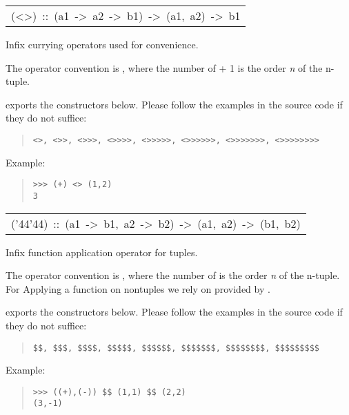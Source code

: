\begin{haddockdesc}
\item[\begin{tabular}{@{}l}
(<>)\ ::\ (a1\ ->\ a2\ ->\ b1)\ ->\ (a1,\ a2)\ ->\ b1
\end{tabular}]\haddockbegindoc
Infix currying operators used for convenience. \par
The operator convention is \haddocktt{(<>+)}, where the number of \haddocktt{>} + 1 is
 the order \emph{n} of the n-tuple.\par
{} exports the constructors below. Please
 follow the examples in the source code if they do not suffice:\par
\begin{quote}
{\haddockverb\begin{verbatim}
<>, <>>, <>>>, <>>>>, <>>>>>, <>>>>>>, <>>>>>>>, <>>>>>>>>\end{verbatim}}
\end{quote}
Example:\par
\begin{quote}
{\haddockverb\begin{verbatim}
>>> (+) <> (1,2)
3

\end{verbatim}}
\end{quote}
\end{haddockdesc}
\begin{haddockdesc}
\item[\begin{tabular}{@{}l}
({\char '44}{\char '44})\ ::\ (a1\ ->\ b1,\ a2\ ->\ b2)\ ->\ (a1,\ a2)\ ->\ (b1,\ b2)
\end{tabular}]\haddockbegindoc
Infix function application operator for tuples. \par
The operator convention is , where the number of  is the
 order \emph{n} of the n-tuple. For Applying a function on nontuples we
 rely on  provided by .\par
{} exports the constructors below. Please
 follow the examples in the source code if they do not suffice:\par
\begin{quote}
{\haddockverb\begin{verbatim}
$$, $$$, $$$$, $$$$$, $$$$$$, $$$$$$$, $$$$$$$$, $$$$$$$$$\end{verbatim}}
\end{quote}
Example:\par
\begin{quote}
{\haddockverb\begin{verbatim}
>>> ((+),(-)) $$ (1,1) $$ (2,2)
(3,-1)

\end{verbatim}}
\end{quote}
\end{haddockdesc}